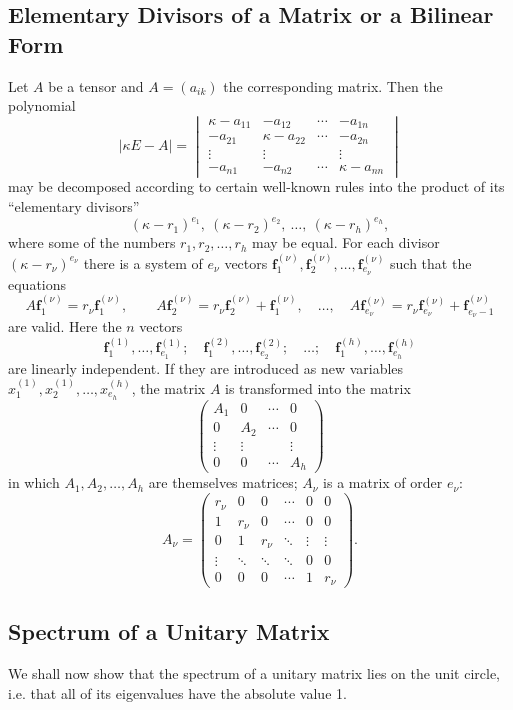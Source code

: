 \subsection{Elementary Divisors of a Matrix or a Bilinear Form}
Let $A$ be a tensor and $A=(a_{ik})$ the corresponding matrix. Then the polynomial
\[
|\kappa E-A|=
\begin{vmatrix}
\kappa-a_{11}&-a_{12}&\cdots&-a_{1n}\\
-a_{21}&\kappa-a_{22}&\cdots&-a_{2n}\\
\vdots&\vdots&&\vdots\\
-a_{n1}&-a_{n2}&\cdots&\kappa-a_{nn}
\end{vmatrix}
\]
may be decomposed according to certain well-known rules into the product of its ``elementary divisors''
\[
(\kappa-r_1)^{e_1},\ (\kappa-r_2)^{e_2},\ \ldots,\ (\kappa-r_h)^{e_h},
\]
where some of the numbers $r_1,r_2,\ldots,r_h$ may be equal. For each divisor $(\kappa-r_\nu)^{e_\nu}$ there is a system of $e_\nu$ vectors $\mathbf f_1^{(\nu)},\mathbf f_2^{(\nu)},\ldots,\mathbf f_{e_\nu}^{(\nu)}$ such that the equations
\[
A\mathbf f_1^{(\nu)}=r_\nu\mathbf f_1^{(\nu)},\qquad
A\mathbf f_2^{(\nu)}=r_\nu\mathbf f_2^{(\nu)}+\mathbf f_1^{(\nu)},\quad\ldots,\quad
A\mathbf f_{e_\nu}^{(\nu)}=r_\nu\mathbf f_{e_\nu}^{(\nu)}+\mathbf f_{e_\nu-1}^{(\nu)}
\]
are valid. Here the $n$ vectors
\[
\mathbf f_1^{(1)},\ldots,\mathbf f_{e_1}^{(1)};\quad
\mathbf f_1^{(2)},\ldots,\mathbf f_{e_2}^{(2)};\quad\ldots;\quad
\mathbf f_1^{(h)},\ldots,\mathbf f_{e_h}^{(h)}
\]
are linearly independent. If they are introduced as new variables $x_1^{(1)},x_2^{(1)},\ldots,x_{e_h}^{(h)}$, the matrix $A$ is transformed into the matrix
\[
\begin{pmatrix}
A_1&0&\cdots&0\\
0&A_2&\cdots&0\\
\vdots&\vdots&&\vdots\\
0&0&\cdots&A_h
\end{pmatrix}
\]
in which $A_1,A_2,\ldots,A_h$ are themselves matrices; $A_\nu$ is a matrix of order $e_\nu$:
\[
A_\nu=
\begin{pmatrix}
r_\nu&0&0&\cdots&0&0\\
1&r_\nu&0&\cdots&0&0\\
0&1&r_\nu&\ddots&\vdots&\vdots\\
\vdots&\ddots&\ddots&\ddots&0&0\\
0&0&0&\cdots&1&r_\nu
\end{pmatrix}.
\]

\subsection{Spectrum of a Unitary Matrix}
We shall now show that the spectrum of a unitary matrix lies on the unit circle, i.e. that all of its eigenvalues have the absolute value 1.


